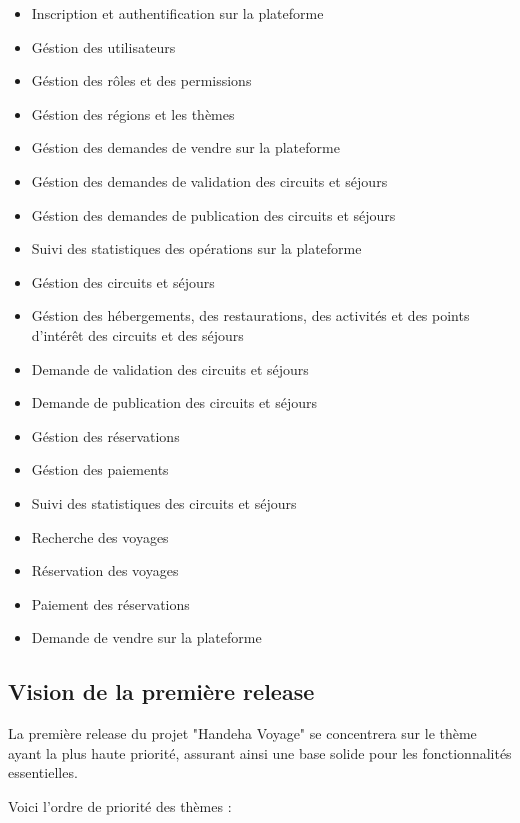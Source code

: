 \documentclass[12pt]{report}
\begin{document}
				\begin{itemize}
					\item Inscription et authentification sur la plateforme
					\item Géstion des utilisateurs
					\item Géstion des rôles et des permissions
					\item Géstion des régions et les thèmes 							
					\item Géstion des demandes de vendre sur la plateforme
					\item Géstion des demandes de validation des circuits et séjours
					\item Géstion des demandes de publication des circuits et séjours 											\item Suivi des statistiques des opérations sur la plateforme
					\item Géstion des circuits et séjours
					\item Géstion des hébergements, des restaurations, des activités et des points d'intérêt des circuits et des séjours
					\item Demande de validation des circuits et séjours
					\item Demande de publication des circuits et séjours
					\item Géstion des réservations
					\item Géstion des paiements
					\item Suivi des statistiques des circuits et séjours
					\item Recherche des voyages
					\item Réservation des voyages
					\item Paiement des réservations
					\item Demande de vendre sur la plateforme							

				\end{itemize}

				\subsection{Vision de la première release}

				\hspace{15pt} La première release du projet "Handeha Voyage" se concentrera sur le thème ayant la plus haute priorité, assurant ainsi une base solide pour les fonctionnalités essentielles.

				Voici l'ordre de priorité des thèmes :
\end{document}
